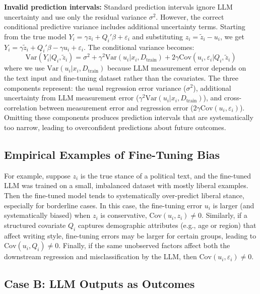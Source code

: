 \documentclass[11pt]{article}
\begin{document}
\textbf{Invalid prediction intervals:} 
Standard prediction intervals ignore LLM uncertainty and use only the residual variance $\sigma^2$. 
However, the correct conditional predictive variance includes additional uncertainty terms. 
Starting from the true model $Y_i = \gamma z_i + Q_i'\beta + \varepsilon_i$ and substituting $z_i = \tilde{z}_i - u_i$, 
we get $Y_i = \gamma\tilde{z}_i + Q_i'\beta - \gamma u_i + \varepsilon_i$. The conditional variance becomes:
\begin{equation}
\text{Var}(Y_i | Q_i, \tilde{z}_i) = \sigma^2 + \gamma^2\text{Var}(u_i | x_i, D_{\text{train}}) + 2\gamma \text{Cov}(u_i, \varepsilon_i | Q_i, \tilde{z}_i) \tag{A3}
\end{equation}
where we use $\text{Var}(u_i | x_i, D_{\text{train}})$ because LLM measurement error depends on the text input and fine-tuning dataset rather than the covariates. 
The three components represent: the usual regression error variance ($\sigma^2$), 
additional uncertainty from LLM measurement error ($\gamma^2\text{Var}(u_i | x_i, D_{\text{train}})$), 
and cross-correlation between measurement error and regression error ($2\gamma \text{Cov}(u_i, \varepsilon_i)$). 
Omitting these components produces prediction intervals that are systematically too narrow, 
leading to overconfident predictions about future outcomes.

\subsection{Empirical Examples of Fine-Tuning Bias}

For example, suppose $z_i$ is the true stance of a political text, 
and the fine-tuned LLM was trained on a small, imbalanced dataset with mostly liberal examples. 
Then the fine-tuned model tends to systematically over-predict liberal stance, especially for borderline cases. 
In this case, the fine-tuning error $u_i$ is larger (and systematically biased) when $z_i$ is conservative, 
$\text{Cov}(u_i, z_i) \neq 0$. Similarly, if a structured covariate $Q_i$ captures demographic attributes 
(e.g., age or region) that affect writing style, fine-tuning errors may be larger for certain groups,
leading to $\text{Cov}(u_i, Q_i) \neq 0$.
Finally, if the same unobserved factors affect both the downstream regression and misclassification by the LLM, 
then $\text{Cov}(u_i, \varepsilon_i) \neq 0$.

\subsection{Case B: LLM Outputs as Outcomes}  
\end{document}
